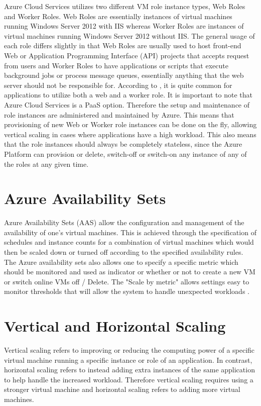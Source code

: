 Azure Cloud Services utilizes two different VM role instance types, Web Roles and Worker Roles. Web Roles are essentially instances of virtual machines running Windows Server 2012 with IIS whereas Worker Roles are instances of virtual machines running Windows Server 2012 without IIS. The general usage of each role differs slightly in that Web Roles are usually used to host front-end Web or Application Programming Interface (API) projects that accepts request from users and Worker Roles to have applications or scripts that execute background jobs or process message queues, essentially anything that the web server should not be responsible for. According to \cite{Microsoft_Corporation_undated-ej}, it is quite common for applications to utilize both a web and a worker role. It is important to note that Azure Cloud Services is a PaaS option. Therefore the setup and maintenance of role instances are administered and maintained by Azure. This means that provisioning of new Web or Worker role instances can be done on the fly, allowing vertical scaling in cases where applications have a high workload. This also means that the role instances should always be completely stateless, since the Azure Platform can provision or delete, switch-off or switch-on any instance of any of the roles at any given time.

\section{Azure Availability Sets}

Azure Availability Sets (AAS) allow the configuration and management of the availability of one's virtual machines. This is achieved through the specification of schedules and instance counts for a combination of virtual machines which would then be scaled down or turned off according to the specified availability rules. The Azure availability sets also allows one to specify a specific metric which should be monitored and used as indicator or whether or not to create a new VM or switch online VMs off / Delete. The "Scale by metric" allows settings easy to monitor thresholds that will allow the system to handle unexpected workloads \cite{Jelen2011}.

\section{Vertical and Horizontal Scaling}

Vertical scaling refers to improving or reducing the computing power of a specific virtual machine running a specific instance or role of an application. In contrast, horizontal scaling refers to instead adding extra instances of the same application to help handle the increased workload. Therefore vertical scaling requires using a stronger virtual machine and horizontal scaling refers to adding more virtual machines.
 
